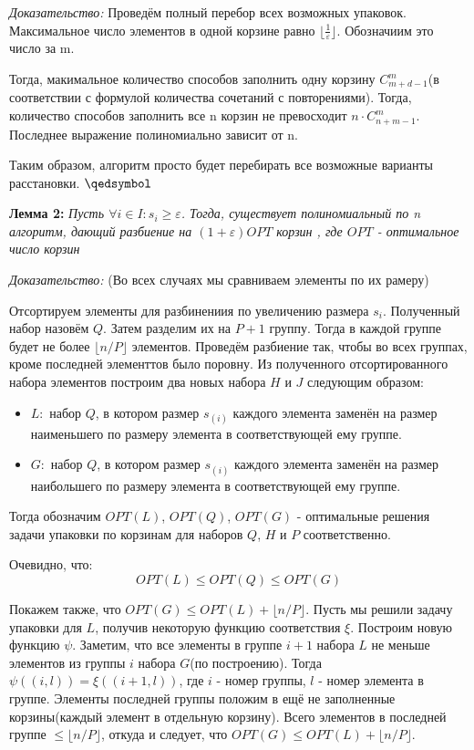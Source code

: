 \documentclass[a4paper,14pt,russian]{article}
\begin{document}
\textit{Доказательство:} Проведём полный перебор всех возможных упаковок. Максимальное число элементов в одной корзине равно $\lfloor{\frac{1}{\varepsilon}\rfloor}$. Обозначиим это число за m. 

Тогда, макимальное количество способов заполнить одну корзину $C_{m+d-1}^{m}$(в соответствии с формулой количества сочетаний с повторениями). Тогда, количество способов заполнить все n корзин не превосходит $n \cdot C_{n+m-1}^{m}$. Последнее выражение полиномиально зависит от n.

Таким образом, алгоритм просто будет перебирать все возможные варианты расстановки.
$\qedsymbol$

{\bf Лемма 2:} \textit{Пусть $\forall i \in I: s_i \geq \varepsilon$. Тогда, существует полиномиальный по n алгоритм, дающий разбиение на $(1 + \varepsilon)OPT$ корзин , где $OPT$ - оптимальное число корзин}

\textit{Доказательство:} (Во всех случаях мы сравниваем элементы по их рамеру)

Отсортируем элементы для разбинениия по увеличению размера $s_i$. Полученный набор назовём $Q$. Затем разделим их на $P + 1$ группу. Тогда в каждой группе будет не более $\lfloor{n/P\rfloor}$ элементов. Проведём разбиение так, чтобы во всех группах, кроме последней элементтов было поровну. Из полученного отсортированного набора элементов построим два новых набора $H$ и $J$ следующим образом: 

\begin{itemize}
  \item $L:$ набор $Q$, в котором размер $s_{(i)}$ каждого элемента заменён на размер наименьшего по размеру элемента в соответствующей ему группе.
  \item $G:$ набор $Q$, в котором размер $s_{(i)}$ каждого элемента заменён на размер наибольшего по размеру элемента в соответствующей ему группе.
\end{itemize}

Тогда обозначим $OPT(L)$, $OPT(Q)$, $OPT(G)$ - оптимальные решения задачи упаковки по корзинам для наборов $Q$, $H$ и $P$ соответственно.

Очевидно, что:
$$OPT(L) \leq OPT(Q) \leq OPT(G)$$

Покажем также, что $OPT(G) \leq OPT(L) + \lfloor{n/P\rfloor}$. Пусть мы решили задачу упаковки для $L$, получив некоторую функцию соответствия $\xi$. Построим новую функцию $\psi$. Заметим, что все элементы в группе $i+1$ набора $L$ не меньше элементов из группы $i$ набора $G$(по построению). Тогда $\psi((i, l)) = \xi((i+1, l))$, где $i$ - номер группы, $l$ - номер элемента в группе. Элементы последней группы положим в ещё не заполненные корзины(каждый элемент в отдельную корзину). Всего элементов в последней группе $\leq \lfloor{n/P\rfloor}$, откуда и следует, что $OPT(G) \leq OPT(L) + \lfloor{n/P\rfloor}$.
\end{document}
